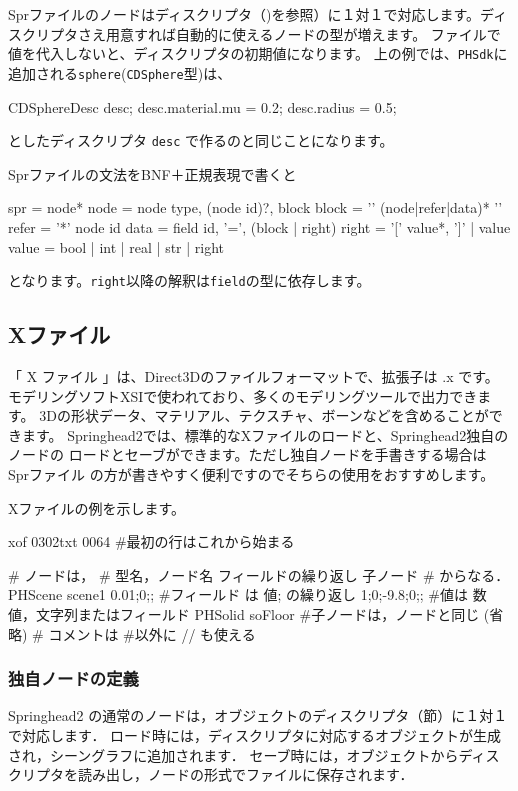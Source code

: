 Spr\KLUDGE ファイルのノードはディスクリプタ（)\KLUDGE を参照）に１対１で対応します。ディスクリプタさえ用意すれば自動的に使えるノードの型が増えます。
\KLUDGE ファイルで値を代入しないと、ディスクリプタの初期値になります。
\KLUDGE 上の例では、\texttt{PHSdk}\KLUDGE に追加される\texttt{sphere}(\texttt{CDSphere}\KLUDGE 型)\KLUDGE は、
\begin{sourcecode}
CDSphereDesc desc;
desc.material.mu = 0.2;
desc.radius = 0.5;
\end{sourcecode}
\KLUDGE としたディスクリプタ \texttt{desc} \KLUDGE で作るのと同じことになります。

Spr\KLUDGE ファイルの文法をBNF\KLUDGE ＋正規表現で書くと
\begin{sourcecode}
spr   = node*
node  = node type, (node id)?, block
block = '{' (node|refer|data)*  '}'
refer = '*' node id
data  = field id, '=', (block | right)
right = '[' value*, ']' | value
value = bool | int | real | str | right
\end{sourcecode}
\KLUDGE となります。\texttt{right}\KLUDGE 以降の解釈は\texttt{field}\KLUDGE の型に依存します。

\subsection{X\KLUDGE ファイル}
\KLUDGE 「 X \KLUDGE ファイル \KLUDGE 」は、Direct3D\KLUDGE のファイルフォーマットで、拡張子は .x \KLUDGE です。
\KLUDGE モデリングソフトXSI\KLUDGE で使われており、多くのモデリングツールで出力できます。
3D\KLUDGE の形状データ、マテリアル、テクスチャ、ボーンなどを含めることができます。
Springhead2\KLUDGE では、標準的なX\KLUDGE ファイルのロードと、Springhead2\KLUDGE 独自のノードの
\KLUDGE ロードとセーブができます。ただし独自ノードを手書きする場合は Spr\KLUDGE ファイル
\KLUDGE の方が書きやすく便利ですのでそちらの使用をおすすめします。

X\KLUDGE ファイルの例を示します。
\begin{sourcecode}
xof 0302txt 0064        #最初の行はこれから始まる

#    ノードは，
#        型名，ノード名 { フィールドの繰り返し   子ノード }
#    からなる．
PHScene scene1{
    0.01;0;;            #フィールド は 値; の繰り返し
    1;0;-9.8;0;;        #値は 数値，文字列またはフィールド
    PHSolid soFloor{    #子ノードは，ノードと同じ
        (省略)
    }
}
# コメントは #以外に // も使える
\end{sourcecode}

\subsubsection{\KLUDGE 独自ノードの定義}
Springhead2 \KLUDGE の通常のノードは，オブジェクトのディスクリプタ（\KLUDGE 節）に１対１で対応します．
\KLUDGE ロード時には，ディスクリプタに対応するオブジェクトが生成され，シーングラフに追加されます．
\KLUDGE セーブ時には，オブジェクトからディスクリプタを読み出し，ノードの形式でファイルに保存されます．


